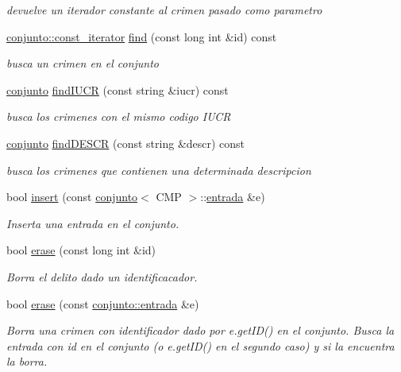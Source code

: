 \begin{DoxyCompactItemize}
\begin{DoxyCompactList}\small\item\em devuelve un iterador constante al crimen pasado como parametro \end{DoxyCompactList}\item 
\hyperlink{classconjunto_1_1const__iterator}{conjunto\-::const\-\_\-iterator} \hyperlink{classconjunto_a523528968fe66ecdaa5dc101a145a5f1}{find} (const long int \&id) const 
\begin{DoxyCompactList}\small\item\em busca un crimen en el conjunto \end{DoxyCompactList}\item 
\hyperlink{classconjunto}{conjunto} \hyperlink{classconjunto_a9a8dabd60a56147e10547a71b2320cb6}{find\-I\-U\-C\-R} (const string \&iucr) const 
\begin{DoxyCompactList}\small\item\em busca los crimenes con el mismo codigo I\-U\-C\-R \end{DoxyCompactList}\item 
\hyperlink{classconjunto}{conjunto} \hyperlink{classconjunto_a52247b879aa00d67b660a3f1d72dc673}{find\-D\-E\-S\-C\-R} (const string \&descr) const 
\begin{DoxyCompactList}\small\item\em busca los crimenes que contienen una determinada descripcion \end{DoxyCompactList}\item 
bool \hyperlink{classconjunto_a61c22092268cc91439b93a2fd96e4173}{insert} (const \hyperlink{classconjunto}{conjunto}$<$ C\-M\-P $>$\-::\hyperlink{classconjunto_a7630ace7cb17bcec07daf5804f1a0780}{entrada} \&e)
\begin{DoxyCompactList}\small\item\em Inserta una entrada en el conjunto. \end{DoxyCompactList}\item 
bool \hyperlink{classconjunto_a92332298c1202e92027b48f01c69ae91}{erase} (const long int \&id)
\begin{DoxyCompactList}\small\item\em Borra el delito dado un identificacador. \end{DoxyCompactList}\item 
bool \hyperlink{classconjunto_a3dd3632366e2280e886888652e4b11e7}{erase} (const \hyperlink{classconjunto_a7630ace7cb17bcec07daf5804f1a0780}{conjunto\-::entrada} \&e)
\begin{DoxyCompactList}\small\item\em Borra una crimen con identificador dado por e.\-get\-I\-D() en el conjunto. Busca la entrada con id en el conjunto (o e.\-get\-I\-D() en el segundo caso) y si la encuentra la borra. \end{DoxyCompactList}\item 

\end{DoxyCompactItemize}
